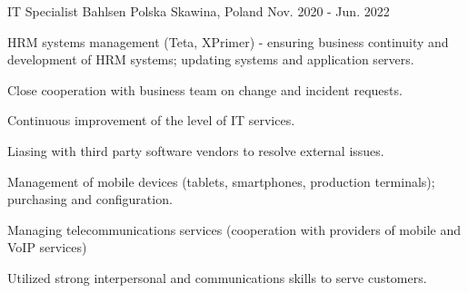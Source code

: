 

\begin{cventries}

  \cventry
    {IT Specialist} %
    {Bahlsen Polska} %
    {Skawina, Poland} %
    {Nov. 2020 - Jun. 2022} %
    {
      \begin{cvitems} %
        \item {HRM systems management (Teta, XPrimer) - ensuring business continuity and development of HRM systems; updating systems and application servers.}
        \item {Close cooperation with business team on change and incident requests.}
        \item {Continuous improvement of the level of IT services.}
        \item {Liasing with third party software vendors to resolve external issues.}
        \item {Management of mobile devices (tablets, smartphones, production terminals); purchasing and configuration.}
        \item {Managing telecommunications services (cooperation with providers of mobile and VoIP services)}
        \item {Utilized strong interpersonal and communications skills to serve customers.}
      \end{cvitems}
    }


\end{cventries}
